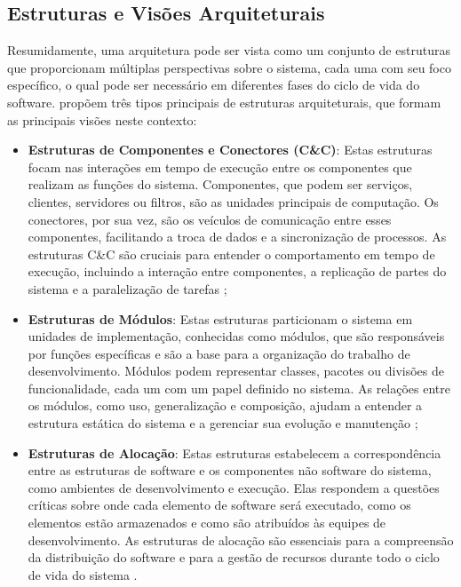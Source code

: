 \subsection{Estruturas e Visões Arquiteturais}

Resumidamente, uma arquitetura pode ser vista como um conjunto de estruturas que proporcionam múltiplas perspectivas sobre o sistema, cada uma com seu foco específico, o qual pode ser necessário em diferentes fases do ciclo de vida do software.  propõem três tipos principais de estruturas arquiteturais, que formam as principais visões neste contexto:

\begin{itemize}

    \item \textbf{Estruturas de Componentes e Conectores (C\&C)}: Estas estruturas focam nas interações em tempo de execução entre os componentes que realizam as funções do sistema. Componentes, que podem ser serviços, clientes, servidores ou filtros, são as unidades principais de computação. Os conectores, por sua vez, são os veículos de comunicação entre esses componentes, facilitando a troca de dados e a sincronização de processos. As estruturas C\&C são cruciais para entender o comportamento em tempo de execução, incluindo a interação entre componentes, a replicação de partes do sistema e a paralelização de tarefas \cite{Bass2021};
    
    \item \textbf{Estruturas de Módulos}: Estas estruturas particionam o sistema em unidades de implementação, conhecidas como módulos, que são responsáveis por funções específicas e são a base para a organização do trabalho de desenvolvimento. Módulos podem representar classes, pacotes ou divisões de funcionalidade, cada um com um papel definido no sistema. As relações entre os módulos, como uso, generalização e composição, ajudam a entender a estrutura estática do sistema e a gerenciar sua evolução e manutenção \cite{Bass2021};
    
    \item \textbf{Estruturas de Alocação}: Estas estruturas estabelecem a correspondência entre as estruturas de software e os componentes não software do sistema, como ambientes de desenvolvimento e execução. Elas respondem a questões críticas sobre onde cada elemento de software será executado, como os elementos estão armazenados e como são atribuídos às equipes de desenvolvimento. As estruturas de alocação são essenciais para a compreensão da distribuição do software e para a gestão de recursos durante todo o ciclo de vida do sistema \cite{Bass2021}.
    
\end{itemize}

